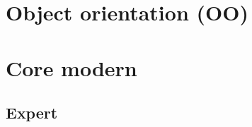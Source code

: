 \documentclass[compress]{beamer}
\begin{document}
\section[OO]{Object orientation (OO)}






\begin{advanced}
  
\end{advanced}


\begin{advanced}
  
\end{advanced}

\section[More]{Core modern \cpp}

\begin{advanced}
  
\end{advanced}

\begin{advanced}
  
  
\end{advanced}



\begin{advanced}
  
  
  
\end{advanced}

\begin{advanced}
  
\end{advanced}

\begin{advanced}
  \section[exp]{Expert \cpp}
  
  
  
  
  
  
  
\end{advanced}
\end{document}
